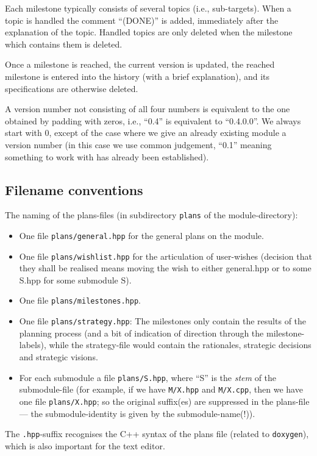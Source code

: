 \documentclass{book}
\newcommand{\filename}[1]{\texttt{#1}}
\newcommand{\name}[1]{\texttt{#1}}
\begin{document}
Each milestone typically consists of several topics (i.e., sub-targets). When a topic is handled the comment ``(DONE)'' is added, immediately after the explanation of the topic. Handled topics are only deleted when the milestone which contains them is deleted.

Once a milestone is reached, the current version is updated, the reached milestone is entered into the history (with a brief explanation), and its specifications are otherwise deleted.

A version number not consisting of all four numbers is equivalent to the one obtained by padding with zeros, i.e., ``0.4'' is equivalent to ``0.4.0.0''. We always start with 0, except of the case where we give an already existing module a version number (in this case we use common judgement, ``0.1'' meaning something to work with has already been established).




\subsection{Filename conventions}
\label{sec:DoxygenPlans}

The naming of the plans-files (in subdirectory \texttt{plans} of the module-directory):
\begin{itemize}
\item One file \filename{plans/general.hpp} for the general plans on the module.
\item One file \filename{plans/wishlist.hpp} for the articulation of user-wishes (decision that they shall be realised means moving the wish to either general.hpp or to some S.hpp for some submodule S).
\item One file \filename{plans/milestones.hpp}.
\item One file \filename{plans/strategy.hpp}: The milestones only contain the results of the planning process (and a bit of indication of direction through the milestone-labels), while the strategy-file would contain the rationales, strategic decisions and strategic visions.
\item For each submodule a file \filename{plans/S.hpp}, where ``S'' is the \emph{stem} of the submodule-file (for example, if we have \filename{M/X.hpp} and \filename{M/X.cpp}, then we have one file \filename{plans/X.hpp}; so the original suffix(es) are suppressed in the plans-file --- the submodule-identity is given by the submodule-name(!)).
\end{itemize}
The \filename{.hpp}-suffix recognises the C++ syntax of the plans file (related to \name{doxygen}), which is also important for the text editor.
\end{document}

